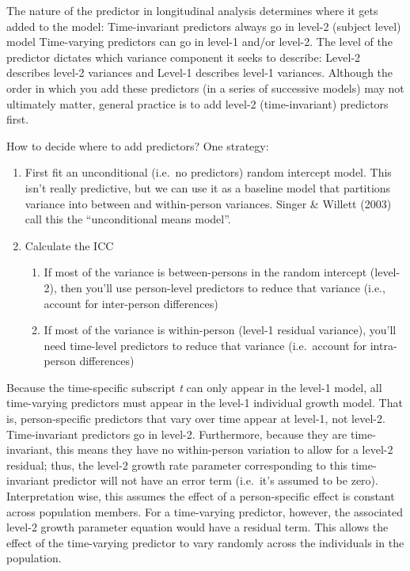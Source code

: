 \documentclass[
  letterpaper,
  DIV=11,
  numbers=noendperiod]{scrreprt}
\begin{document}
The nature of the predictor in longitudinal analysis determines where it
gets added to the model: Time-invariant predictors always go in level-2
(subject level) model Time-varying predictors can go in level-1 and/or
level-2. The level of the predictor dictates which variance component it
seeks to describe: Level-2 describes level-2 variances and Level-1
describes level-1 variances. Although the order in which you add these
predictors (in a series of successive models) may not ultimately matter,
general practice is to add level-2 (time-invariant) predictors first.

How to decide where to add predictors? One strategy:

\begin{enumerate}
\def\labelenumi{\arabic{enumi}.}
\item
  First fit an unconditional (i.e.~no predictors) random intercept
  model. This isn't really predictive, but we can use it as a baseline
  model that partitions variance into between and within-person
  variances. Singer \& Willett (2003) call this the ``unconditional
  means model''.
\item
  Calculate the ICC

  \begin{enumerate}
  \def\labelenumii{\arabic{enumii}.}
  \item
    If most of the variance is between-persons in the random intercept
    (level-2), then you'll use person-level predictors to reduce that
    variance (i.e., account for inter-person differences)
  \item
    If most of the variance is within-person (level-1 residual
    variance), you'll need time-level predictors to reduce that variance
    (i.e.~account for intra-person differences)
  \end{enumerate}
\end{enumerate}

Because the time-specific subscript \emph{t} can only appear in the
level-1 model, all time-varying predictors must appear in the level-1
individual growth model. That is, person-specific predictors that vary
over time appear at level-1, not level-2. Time-invariant predictors go
in level-2. Furthermore, because they are time-invariant, this means
they have no within-person variation to allow for a level-2 residual;
thus, the level-2 growth rate parameter corresponding to this
time-invariant predictor will not have an error term (i.e.~it's assumed
to be zero). Interpretation wise, this assumes the effect of a
person-specific effect is constant across population members. For a
time-varying predictor, however, the associated level-2 growth parameter
equation would have a residual term. This allows the effect of the
time-varying predictor to vary randomly across the individuals in the
population.
\end{document}
